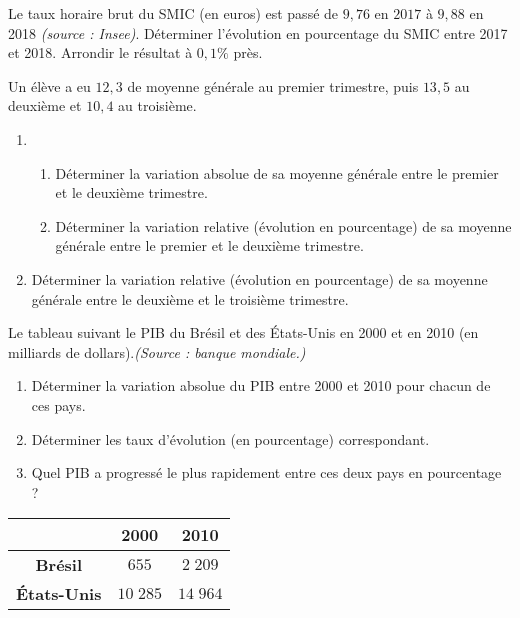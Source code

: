 \documentclass[11pt]{article}
\begin{document}
\begin{exo}
Le taux horaire brut du SMIC (en euros) est passé de $9,76$ en $2017$ à $9,88$
en 2018 \emph{(source : Insee)}. Déterminer l'évolution en pourcentage du SMIC
entre 2017 et 2018. Arrondir le résultat à $0,1\%$ près.
\end{exo}

\begin{exo}
Un élève a eu $12,3$ de moyenne générale au premier
trimestre, puis $13,5$ au deuxième et $10,4$ au troisième.
\begin{enumerate}
  \item \begin{enumerate}
      \item Déterminer la variation absolue de sa moyenne générale entre le
        premier et le deuxième trimestre.
      \item Déterminer la variation relative (évolution en pourcentage) de sa
        moyenne générale entre le premier et le deuxième trimestre.
    \end{enumerate}
      \item Déterminer la variation relative (évolution en pourcentage) de sa
        moyenne générale entre le deuxième et le troisième trimestre.
\end{enumerate}
\end{exo}

\begin{exo}
Le tableau suivant le PIB du Brésil et des États-Unis en 2000 et en 2010 (en
milliards de dollars).\hfill\emph{(Source : banque mondiale.)}\\
\begin{minipage}{.7\textwidth}
  \begin{enumerate}
    \item Déterminer la variation absolue du PIB entre 2000 et 2010 pour chacun
      de ces pays.
    \item Déterminer les taux d'évolution (en pourcentage) correspondant.
    \item Quel PIB a progressé le plus rapidement entre ces deux pays en
      pourcentage ?
  \end{enumerate}
\end{minipage}
\begin{minipage}{.3\textwidth}
  \begin{tabular}{ccc}
    \toprule
    & \textbf{2000} & \textbf{2010} \\
    \midrule
    \textbf{Brésil} & $ 655$ & $2\;209$ \\
    \textbf{États-Unis} & $10\;285$ & $14\;964$\\
    \bottomrule
  \end{tabular}
\end{minipage}
\end{exo}
\end{document}
